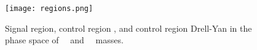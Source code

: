 \begin{figure}[!htb]%
  \begin{center}
    \texttt{[image: regions.png]}
    \caption{ Signal region, control region \ttbar, and control region Drell-Yan in the phase space of \ZtoLL \ ~and ~\HBB ~masses.    }
    \label{fig:regions}
  \end{center}
\end{figure}






